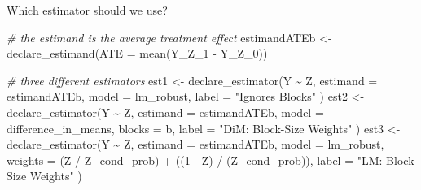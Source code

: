 \documentclass[
  ignorenonframetext,
]{beamer}
\newenvironment{Shaded}{\begin{snugshade}}{\end{snugshade}}
\newcommand{\AttributeTok}[1]{\textcolor[rgb]{0.77,0.63,0.00}{#1}}
\newcommand{\CommentTok}[1]{\textcolor[rgb]{0.56,0.35,0.01}{\textit{#1}}}
\newcommand{\DecValTok}[1]{\textcolor[rgb]{0.00,0.00,0.81}{#1}}
\newcommand{\FunctionTok}[1]{\textcolor[rgb]{0.00,0.00,0.00}{#1}}
\newcommand{\NormalTok}[1]{#1}
\newcommand{\OtherTok}[1]{\textcolor[rgb]{0.56,0.35,0.01}{#1}}
\newcommand{\SpecialCharTok}[1]{\textcolor[rgb]{0.00,0.00,0.00}{#1}}
\newcommand{\StringTok}[1]{\textcolor[rgb]{0.31,0.60,0.02}{#1}}
\begin{document}
\begin{frame}[fragile]{Which estimator should we use?}
\protect\hypertarget{which-estimator-should-we-use-1}{}
\scriptsize

\begin{Shaded}
\begin{Highlighting}[]
\CommentTok{\# the estimand is the average treatment effect}
\NormalTok{estimandATEb }\OtherTok{\textless{}{-}} \FunctionTok{declare\_estimand}\NormalTok{(}\AttributeTok{ATE =} \FunctionTok{mean}\NormalTok{(Y\_Z\_1 }\SpecialCharTok{{-}}\NormalTok{ Y\_Z\_0))}

\CommentTok{\# three different estimators}
\NormalTok{est1 }\OtherTok{\textless{}{-}} \FunctionTok{declare\_estimator}\NormalTok{(Y }\SpecialCharTok{\textasciitilde{}}\NormalTok{ Z,}
  \AttributeTok{estimand =}\NormalTok{ estimandATEb, }\AttributeTok{model =}\NormalTok{ lm\_robust,}
  \AttributeTok{label =} \StringTok{"Ignores Blocks"}
\NormalTok{)}
\NormalTok{est2 }\OtherTok{\textless{}{-}} \FunctionTok{declare\_estimator}\NormalTok{(Y }\SpecialCharTok{\textasciitilde{}}\NormalTok{ Z,}
  \AttributeTok{estimand =}\NormalTok{ estimandATEb, }\AttributeTok{model =}\NormalTok{ difference\_in\_means, }\AttributeTok{blocks =}\NormalTok{ b,}
  \AttributeTok{label =} \StringTok{"DiM: Block{-}Size Weights"}
\NormalTok{)}
\NormalTok{est3 }\OtherTok{\textless{}{-}} \FunctionTok{declare\_estimator}\NormalTok{(Y }\SpecialCharTok{\textasciitilde{}}\NormalTok{ Z,}
  \AttributeTok{estimand =}\NormalTok{ estimandATEb, }\AttributeTok{model =}\NormalTok{ lm\_robust,}
  \AttributeTok{weights =}\NormalTok{ (Z }\SpecialCharTok{/}\NormalTok{ Z\_cond\_prob) }\SpecialCharTok{+}\NormalTok{ ((}\DecValTok{1} \SpecialCharTok{{-}}\NormalTok{ Z) }\SpecialCharTok{/}\NormalTok{ (Z\_cond\_prob)),}
  \AttributeTok{label =} \StringTok{"LM: Block Size Weights"}
\NormalTok{)}
\end{Highlighting}
\end{Shaded}

\normalsize
\end{frame}
\end{document}
